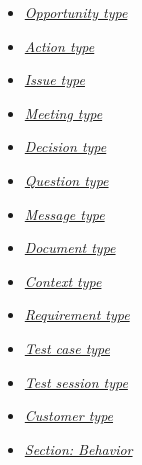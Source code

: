 \documentclass[letterpaper,10pt,english]{sphinxmanual}
\begin{document}
{\begin{minipage}{0.95\linewidth}
\begin{itemize}
\item {} 
\label{ListsOfTypes:id12}{\hyperref[ListsOfTypes:opportunity-type]{\emph{Opportunity type}}}

\item {} 
\label{ListsOfTypes:id13}{\hyperref[ListsOfTypes:action-type]{\emph{Action type}}}

\item {} 
\label{ListsOfTypes:id14}{\hyperref[ListsOfTypes:issue-type]{\emph{Issue type}}}

\item {} 
\label{ListsOfTypes:id15}{\hyperref[ListsOfTypes:meeting-type]{\emph{Meeting type}}}

\item {} 
\label{ListsOfTypes:id16}{\hyperref[ListsOfTypes:decision-type]{\emph{Decision type}}}

\item {} 
\label{ListsOfTypes:id17}{\hyperref[ListsOfTypes:question-type]{\emph{Question type}}}

\item {} 
\label{ListsOfTypes:id18}{\hyperref[ListsOfTypes:message-type]{\emph{Message type}}}

\item {} 
\label{ListsOfTypes:id19}{\hyperref[ListsOfTypes:document-type]{\emph{Document type}}}

\item {} 
\label{ListsOfTypes:id20}{\hyperref[ListsOfTypes:context-type]{\emph{Context type}}}

\item {} 
\label{ListsOfTypes:id21}{\hyperref[ListsOfTypes:requirement-type]{\emph{Requirement type}}}

\item {} 
\label{ListsOfTypes:id22}{\hyperref[ListsOfTypes:test-case-type]{\emph{Test case type}}}

\item {} 
\label{ListsOfTypes:id23}{\hyperref[ListsOfTypes:test-session-type]{\emph{Test session type}}}

\item {} 
\label{ListsOfTypes:id24}{\hyperref[ListsOfTypes:customer-type]{\emph{Customer type}}}

\item {} 
\label{ListsOfTypes:id25}{\hyperref[ListsOfTypes:section-behavior]{\emph{Section: Behavior}}}

\end{itemize}
\end{minipage}}
\begin{center}\setlength{\fboxsep}{5pt}\end{center}
\end{document}
